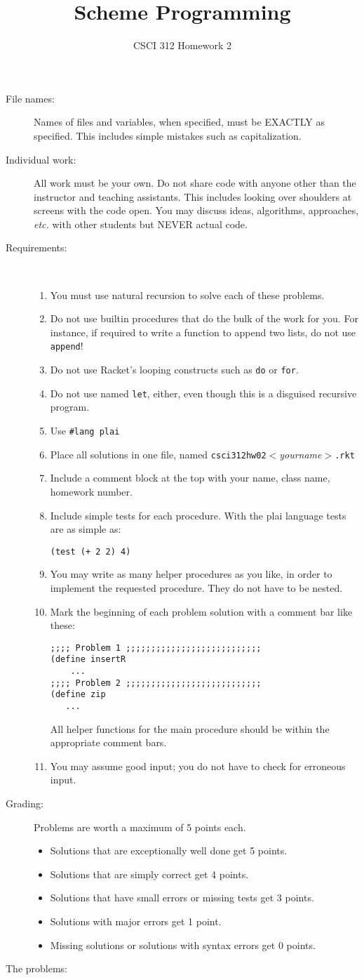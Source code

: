 \documentclass[12pt]{article}
\author{CSCI 312 Homework 2}
\title{Scheme Programming}
\newcommand{\bi}{\begin{itemize}}
\newcommand{\li}{\item}
\newcommand{\ei}{\end{itemize}}
\begin{document}
\maketitle
\begin{description}

\item[File names:]  Names of files and variables, when specified,
must be EXACTLY as specified.  This includes simple mistakes such
as capitalization.

\item[Individual work:]  All work must be your own.  Do not share
code with anyone other than the instructor and teaching assistants.
This includes looking over shoulders at screens with the code open.
You may discuss ideas, algorithms, approaches, {\em etc.} with
other students but NEVER actual code.

\item[Requirements:]~

\begin{enumerate}
\li
You must use natural recursion to solve each of these problems.
\li
Do not use builtin procedures that do the bulk of the work
for you.  For instance, if required to write a function to
append two lists, do not use \lstinline{append}!
\li
Do not use Racket's looping constructs such as \lstinline{do}
or \lstinline{for}. 
\li
 Do not use named \lstinline{let}, either,
even though this is a disguised recursive program.  
\li Use \lstinline{#lang plai} 
\li Place all solutions in one file, named
{\tt csci312hw02}{\em $<$yourname$>$}{\tt .rkt}
\li Include a comment block at the top with your
name, class name, homework number.
\li Include simple tests for each procedure.  With the plai
language tests are as simple as:
\begin{lstlisting}
(test (+ 2 2) 4)
\end{lstlisting}
\li You may write as many helper procedures as you like,
in order to implement the requested procedure.  They do not
have to be nested.
\li Mark the beginning of each problem solution with a
comment bar like these:
\begin{lstlisting}
;;;; Problem 1 ;;;;;;;;;;;;;;;;;;;;;;;;;;;
(define insertR
    ...
;;;; Problem 2 ;;;;;;;;;;;;;;;;;;;;;;;;;;;
(define zip
   ...
\end{lstlisting}
All helper functions for the main procedure should be within
the appropriate comment bars.
\li You may assume good input; you do not have to check
for erroneous input.
\end{enumerate}

\item[Grading:]  Problems are worth a maximum of 5 points each.
\bi
\li Solutions
that are exceptionally well done get 5 points.
\li 
Solutions that are simply correct get 4 points.  
\li
Solutions that have small errors or missing tests get 3 points.
\li 
Solutions with major errors get 1 point.
\li 
Missing solutions or solutions with syntax errors get 0 points.
\ei

\item[The problems:]
\end{description}
\end{document}
